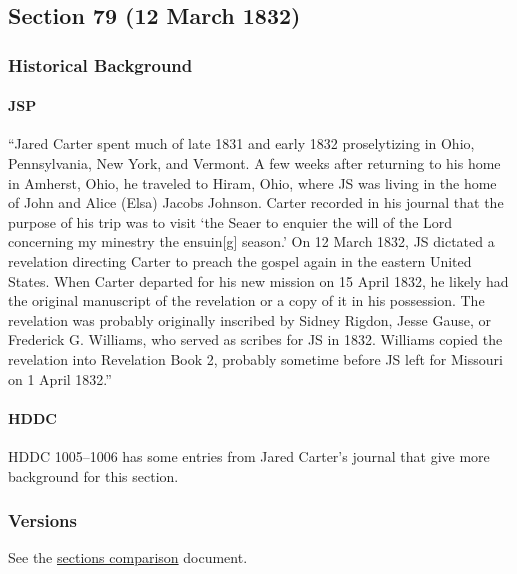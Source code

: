 \subsection{Section 79 (12 March 1832)}
	\label{DC79}
	
	\subsubsection{Historical Background}
		\label{DC79-HB}
		
		\paragraph{JSP}
		
			``Jared Carter spent much of late 1831 and early 1832 proselytizing in Ohio, Pennsylvania, New York, and Vermont. A few weeks after returning to his home in Amherst, Ohio, he traveled to Hiram, Ohio, where JS was living in the home of John and Alice (Elsa) Jacobs Johnson. Carter recorded in his journal that the purpose of his trip was to visit `the Seaer to enquier the will of the Lord concerning my minestry the ensuin[g] season.' On 12 March 1832, JS dictated a revelation directing Carter to preach the gospel again in the eastern United States. When Carter departed for his new mission on 15 April 1832, he likely had the original manuscript of the revelation or a copy of it in his possession. The revelation was probably originally inscribed by Sidney Rigdon, Jesse Gause, or Frederick G. Williams, who served as scribes for JS in 1832. Williams copied the revelation into Revelation Book 2, probably sometime before JS left for Missouri on 1 April 1832.''
			
		\paragraph{HDDC}
		
			HDDC 1005--1006 has some entries from Jared Carter's journal that give more background for this section.
		
	\subsubsection{Versions}
		\label{DC79-V}
		
		See the \href{https://drive.google.com/file/d/1goAvNz8jS4R8slYfMG_db55Ty2z_vmgK/view?usp=sharing}{sections comparison} document.
	
